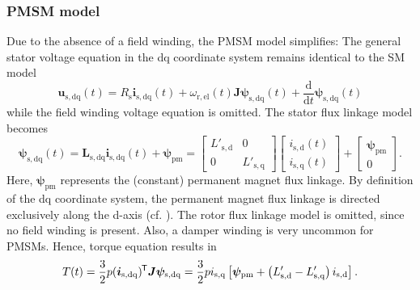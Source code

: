 \begin{frame}
	\frametitle{PMSM model}
	Due to the absence of a field winding, the PMSM model simplifies: The general stator voltage equation in the dq coordinate system remains identical to the SM model
	$$\bm{u}_\mathrm{s,dq}(t) = R_\mathrm{s} \bm{i}_\mathrm{s,dq}(t)+ \omega_\mathrm{r,el}(t)\bm{J}\bm{\psi}_\mathrm{s,dq}(t) + \frac{\mathrm{d}}{\mathrm{d}t}\bm{\psi}_\mathrm{s,dq}(t)$$
	while the field winding voltage equation is omitted. \pause The stator flux linkage model becomes
	\begin{equation}
		\bm{\psi}_\mathrm{s,dq}(t) = \bm{L}_\mathrm{s,dq}\bm{i}_{\mathrm{s,dq}}(t) + \bm{\psi}_\mathrm{pm} = \begin{bmatrix}
			L'_\mathrm{s,d} & 0\\
			0 & L'_\mathrm{s,q}
		\end{bmatrix} \begin{bmatrix}
			i_{\mathrm{s,d}}(t) \\ i_{\mathrm{s,q}}(t)
		\end{bmatrix} + \begin{bmatrix}
			\bm{\psi}_\mathrm{pm} \\ 0
		\end{bmatrix}.
	\end{equation}
	Here, $\bm{\psi}_\mathrm{pm}$ represents the (constant) permanent magnet flux linkage. \pause By definition of the dq coordinate system, the permanent magnet flux linkage is directed exclusively along the d-axis (cf. ). The rotor flux linkage model is omitted, since no field winding is present. Also, a damper winding is very uncommon for PMSMs. \pause Hence, torque equation results in
	\begin{equation}
		T(t) = \frac{3}{2} p (\bm{i}_\mathrm{s,dq})^{\mkern-1.5mu\mathsf{T}}\bm{J}\bm{\psi}_\mathrm{s,dq} = \frac{3}{2} p i_\mathrm{s,q}\left[ \bm{\psi}_\mathrm{pm} + \left(L'_\mathrm{s,d}-L'_\mathrm{s,q}\right)i_\mathrm{s,d}\right].
	\end{equation}
\end{frame}

